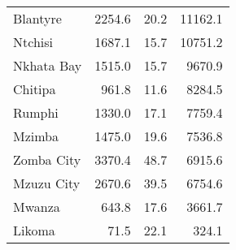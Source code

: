 \begin{tabular}{lrrr}
Blantyre      &      2254.6 &         20.2 &          11162.1 \\
Ntchisi       &      1687.1 &         15.7 &          10751.2 \\
Nkhata Bay    &      1515.0 &         15.7 &           9670.9 \\
Chitipa       &       961.8 &         11.6 &           8284.5 \\
Rumphi        &      1330.0 &         17.1 &           7759.4 \\
Mzimba        &      1475.0 &         19.6 &           7536.8 \\
Zomba City    &      3370.4 &         48.7 &           6915.6 \\
Mzuzu City    &      2670.6 &         39.5 &           6754.6 \\
Mwanza        &       643.8 &         17.6 &           3661.7 \\
Likoma        &        71.5 &         22.1 &            324.1 \\
\bottomrule
\end{tabular}
